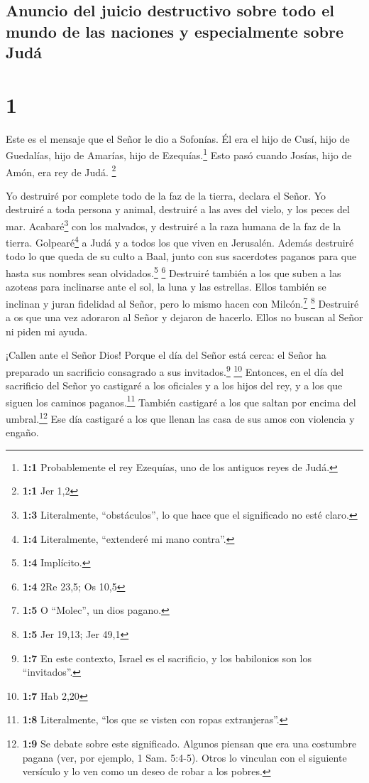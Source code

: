 \hypertarget{anuncio-del-juicio-destructivo-sobre-todo-el-mundo-de-las-naciones-y-especialmente-sobre-juduxe1}{%
\subsection{Anuncio del juicio destructivo sobre todo el mundo de las
naciones y especialmente sobre
Judá}\label{anuncio-del-juicio-destructivo-sobre-todo-el-mundo-de-las-naciones-y-especialmente-sobre-juduxe1}}

\hypertarget{section}{%
\section{1}\label{section}}

 Este es el mensaje que el Señor le dio a Sofonías. Él era
el hijo de Cusí, hijo de Guedalías, hijo de Amarías, hijo de
Ezequías.\footnote{\textbf{1:1} Probablemente el rey Ezequías, uno de
  los antiguos reyes de Judá.} Esto pasó cuando Josías, hijo de Amón,
era rey de Judá. \footnote{\textbf{1:1} Jer 1,2}

 Yo destruiré por complete todo de la faz de la tierra,
declara el Señor.  Yo destruiré a toda persona y animal,
destruiré a las aves del vielo, y los peces del mar. Acabaré\footnote{\textbf{1:3}
  Literalmente, ``obstáculos'', lo que hace que el significado no esté
  claro.} con los malvados, y destruiré a la raza humana de la faz de la
tierra.  Golpearé\footnote{\textbf{1:4} Literalmente,
  ``extenderé mi mano contra''.} a Judá y a todos los que viven en
Jerusalén. Además destruiré todo lo que queda de su culto a Baal, junto
con sus sacerdotes paganos para que hasta sus nombres sean
olvidados.\footnote{\textbf{1:4} Implícito.} \footnote{\textbf{1:4} 2Re
  23,5; Os 10,5}  Destruiré también a los que suben a las
azoteas para inclinarse ante el sol, la luna y las estrellas. Ellos
también se inclinan y juran fidelidad al Señor, pero lo mismo hacen con
Milcón.\footnote{\textbf{1:5} O ``Molec'', un dios pagano.} \footnote{\textbf{1:5}
  Jer 19,13; Jer 49,1}  Destruiré a os que una vez
adoraron al Señor y dejaron de hacerlo. Ellos no buscan al Señor ni
piden mi ayuda.

 ¡Callen ante el Señor Dios! Porque el día del Señor está
cerca: el Señor ha preparado un sacrificio consagrado a sus
invitados.\footnote{\textbf{1:7} En este contexto, Israel es el
  sacrificio, y los babilonios son los ``invitados''.} \footnote{\textbf{1:7}
  Hab 2,20}  Entonces, en el día del sacrificio del Señor
yo castigaré a los oficiales y a los hijos del rey, y a los que siguen
los caminos paganos.\footnote{\textbf{1:8} Literalmente, ``los que se
  visten con ropas extranjeras''.}  También castigaré a
los que saltan por encima del umbral.\footnote{\textbf{1:9} Se debate
  sobre este significado. Algunos piensan que era una costumbre pagana
  (ver, por ejemplo, 1 Sam. 5:4-5). Otros lo vinculan con el siguiente
  versículo y lo ven como un deseo de robar a los pobres.} Ese día
castigaré a los que llenan las casa de sus amos con violencia y engaño.

